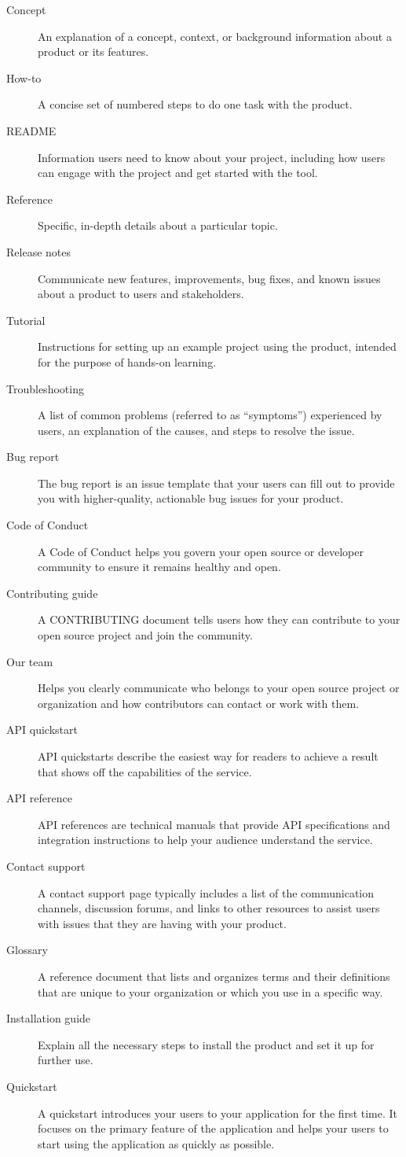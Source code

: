 \begin{description}
	\item[Concept] An explanation of a concept, context, or background information about a product or its features.
	\item[How-to] A concise set of numbered steps to do one task with the product.
	\item[README] Information users need to know about your project, including how users can engage with the project and get started with the tool.
	\item[Reference] Specific, in-depth details about a particular topic.
	\item[Release notes] Communicate new features, improvements, bug fixes, and known issues about a product to users and stakeholders.
	\item[Tutorial] Instructions for setting up an example project using the product, intended for the purpose of hands-on learning.
	\item[Troubleshooting] A list of common problems (referred to as ``symptoms'') experienced by users, an explanation of the causes, and steps to resolve the issue.
	\item[Bug report] The bug report is an issue template that your users can fill out to provide you with higher-quality, actionable bug issues for your product.
	\item[Code of Conduct] A Code of Conduct helps you govern your open source or developer community to ensure it remains healthy and open.
	\item[Contributing guide] A CONTRIBUTING document tells users how they can contribute to your open source project and join the community.
	\item[Our team] Helps you clearly communicate who belongs to your open source project or organization and how contributors can contact or work with them.
	\item[API quickstart] API quickstarts describe the easiest way for readers to achieve a result that shows off the capabilities of the service.
	\item[API reference] API references are technical manuals that provide API specifications and integration instructions to help your audience understand the service.
	\item[Contact support] A contact support page typically includes a list of the communication channels, discussion forums, and links to other resources to assist users with issues that they are having with your product.
	\item[Glossary] A reference document that lists and organizes terms and their definitions that are unique to your organization or which you use in a specific way.
	\item[Installation guide] Explain all the necessary steps to install the product and set it up for further use.
	\item[Quickstart] A quickstart introduces your users to your application for the first time. It focuses on the primary feature of the application and helps your users to start using the application as quickly as possible.
\end{description}


